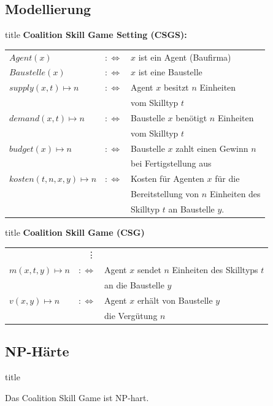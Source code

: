 \documentclass[c]{beamer}
\theoremstyle{break}
\begin{document}
  \subsection*{Modellierung}
  \begin{frame}{title} %
    \textbf{Coalition Skill Game Setting (CSGS):}
    \begin{tabular}{lrl}
    $Agent(x)$&$:\Leftrightarrow$& $x$ ist ein Agent (Baufirma) \\
    $Baustelle(x) $&$:\Leftrightarrow$& $x$ ist eine Baustelle \\
    $supply(x, t)\mapsto n $&$:\Leftrightarrow$& Agent $x$ besitzt $n$ Einheiten \\&& vom Skilltyp $t$ \\
    $demand(x, t)\mapsto n $&$:\Leftrightarrow$& Baustelle $x$ benötigt $n$ Einheiten \\&& vom Skilltyp $t$ \\
    $budget(x)\mapsto n $&$:\Leftrightarrow$&
    Baustelle $x$ zahlt einen Gewinn $n$ \\&& bei Fertigstellung aus\\
    $kosten(t, n, x, y)\mapsto n$&$:\Leftrightarrow$& Kosten für Agenten $x$ für die \\&& Bereitstellung von $n$ Einheiten des \\&& Skilltyp $t$ an Baustelle $y$.
    \end{tabular}
  \end{frame}

  \begin{frame}{title}
    \textbf{Coalition Skill Game (CSG)}
    \begin{tabular}{lrl}
      &\vdots\\
    $m(x, t, y)\mapsto n$&$:\Leftrightarrow$& Agent $x$ sendet $n$ Einheiten des Skilltyps $t$ \\&& an die Baustelle $y$ \\
    $v(x,y)\mapsto n$&$:\Leftrightarrow$& Agent $x$ erhält von Baustelle $y$ \\&& die Vergütung $n$
    \end{tabular}
  \end{frame}

  \subsection*{NP-Härte}
  \begin{frame}{title} %
    \begin{lemma}
      Das Coalition Skill Game ist NP-hart.
    \end{lemma}
  \end{frame}
\end{document}
